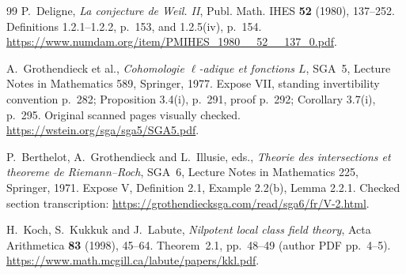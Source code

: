 \documentclass[11pt,a4paper]{article}
\theoremstyle{definition}
\begin{document}
\begin{thebibliography}{99}
P.~Deligne, \emph{La conjecture de Weil. II},
Publ. Math. IHES \textbf{52} (1980), 137--252.
Definitions 1.2.1--1.2.2, p.~153, and 1.2.5(iv), p.~154.
\url{https://www.numdam.org/item/PMIHES_1980__52__137_0.pdf}.


A.~Grothendieck et al., \emph{Cohomologie $\ell$-adique et fonctions $L$},
SGA~5, Lecture Notes in Mathematics 589, Springer, 1977.
Expose VII, standing invertibility convention p.~282; Proposition 3.4(i), p.~291, proof p.~292; Corollary 3.7(i), p.~295. Original scanned pages visually checked.
\url{https://wstein.org/sga/sga5/SGA5.pdf}.


P.~Berthelot, A.~Grothendieck and L.~Illusie, eds.,
\emph{Theorie des intersections et theoreme de Riemann--Roch},
SGA~6, Lecture Notes in Mathematics 225, Springer, 1971.
Expose V, Definition 2.1, Example 2.2(b), Lemma 2.2.1.
Checked section transcription:
\url{https://grothendiecksga.com/read/sga6/fr/V-2.html}.

H.~Koch, S.~Kukkuk and J.~Labute, \emph{Nilpotent local class field theory},
Acta Arithmetica \textbf{83} (1998), 45--64.
Theorem~2.1, pp.~48--49 (author PDF pp.~4--5).
\url{https://www.math.mcgill.ca/labute/papers/kkl.pdf}.

\end{thebibliography}
\end{document}
